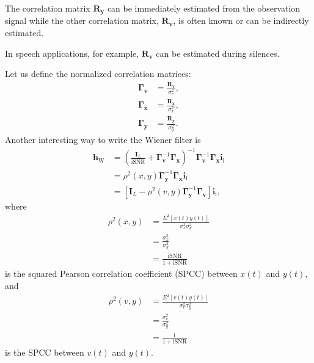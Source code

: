 \documentclass[10pt,pdflatex,headrule,landscape]{beamer}
\begin{document}
\begin{frame}[allowframebreaks]

The correlation matrix $\mathbf{R}_{\mathbf{y}}$ can be immediately estimated from the observation signal while the other correlation matrix, $\mathbf{R}_{\mathbf{v}}$, is often known or can be indirectly estimated.

In speech applications, for example, $\mathbf{R}_{\mathbf{v}}$ can be estimated during silences.

Let us define the normalized correlation matrices:
\begin{align*}
 \mathbf{\Gamma}_{\mathbf{v}} &= \frac{ \mathbf{R}_{\mathbf{v}} }{ \sigma_v^2 }, \\
 \mathbf{\Gamma}_{\mathbf{x}} &= \frac{ \mathbf{R}_{\mathbf{x}} }{ \sigma_x^2 }, \\
 \mathbf{\Gamma}_{\mathbf{y}} &= \frac{ \mathbf{R}_{\mathbf{y}} }{ \sigma_y^2 }.
\end{align*}
Another interesting way to write the Wiener filter is
\begin{align}
\label{C2-Wiener-filt3}
 \mathbf{h}_{\mathrm{W}} &= \left( \frac{ \mathbf{I}_L } { \mathrm{iSNR} }
 + \mathbf{\Gamma}_{\mathbf{v}}^{-1} \mathbf{\Gamma}_{\mathbf{x}} \right)^{-1}
 \mathbf{\Gamma}_{\mathbf{v}}^{-1} \mathbf{\Gamma}_{\mathbf{x}} \mathbf{i}_{\mathrm{i}} \\
 &= \rho^2(x,y) \mathbf{\Gamma}_{\mathbf{y}}^{-1} \mathbf{\Gamma}_{\mathbf{x}} \mathbf{i}_{\mathrm{i}} \nonumber \\
 &= \left[ \mathbf{I}_L - \rho^2(v,y) \mathbf{\Gamma}_{\mathbf{y}}^{-1} \mathbf{\Gamma}_{\mathbf{v}} \right] \mathbf{i}_{\mathrm{i}}, \nonumber
\end{align}
where
\begin{align}
\label{C2-SPCC-xy}
 \rho^2(x,y) &= \frac{ E^2 \left[ x(t) y(t) \right]}{ \sigma_x^2 \sigma_y^2 } \\
 &= \frac{ \sigma_x^2 }{ \sigma_y^2 } \nonumber \\
 &= \frac{ \mathrm{iSNR} }{ 1 + \mathrm{iSNR} } \nonumber
\end{align}
is the squared Pearson correlation coefficient (SPCC) between $x(t)$ and $y(t)$, and
\begin{align}
\label{C2-SPCC-vy}
 \rho^2(v,y) &= \frac{ E^2 \left[ v(t) y(t) \right]}{ \sigma_v^2 \sigma_y^2 } \\
 &= \frac{ \sigma_v^2 }{ \sigma_y^2 } \nonumber \\
 &= \frac{ 1 }{ 1 + \mathrm{iSNR} } \nonumber
\end{align}
is the SPCC between $v(t)$ and $y(t)$.


\end{frame}
\end{document}
